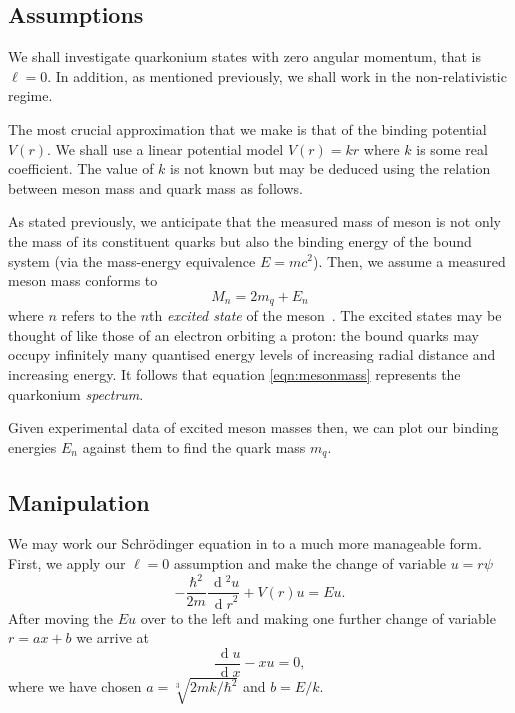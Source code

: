 \documentclass[]{article}
\renewcommand{\d}[1]{\ensuremath{\,\operatorname{d}\!{#1}}}
\begin{document}
\subsection{Assumptions}\label{ssec:assumptions}

We shall investigate quarkonium states with zero angular momentum, that is $\ell = 0$. In addition, as mentioned previously, we shall work in the non-relativistic regime.

The most crucial approximation that we make is that of the binding potential $V(r)$. We shall use a linear potential model $V(r) = kr$ where $k$ is some real coefficient. The value of $k$ is not known but may be deduced using the relation between meson mass and quark mass as follows.

As stated previously, we anticipate that the measured mass of meson is not only the mass of its constituent quarks but also the binding energy of the bound system (via the mass-energy equivalence $E=mc^{2}$). Then, we assume a measured meson mass conforms to
\begin{equation}\label{eqn:mesonmass}
M_{n} = 2m_{q} + E_{n}
\end{equation}
where $n$ refers to the $n$th \emph{excited state} of the meson~\cite{ref:buchmuller}. The excited states may be thought of like those of an electron orbiting a proton: the bound quarks may occupy infinitely many quantised energy levels of increasing radial distance and increasing energy. It follows that equation \ref{eqn:mesonmass} represents the quarkonium \emph{spectrum}.

Given experimental data of excited meson masses then, we can plot our binding energies $E_{n}$ against them to find the quark mass $m_{q}$.

\subsection{Manipulation}

We may work our Schr\"{o}dinger equation in to a much more manageable form. First, we apply our $\ell = 0$ assumption and make the change of variable $u = r\psi$
\[
-\frac{\hbar^{2}}{2m}
 \frac{\d{^{2}u}}{\d{r}^{2}}
+ V(r)u = Eu.
\]
After moving the $Eu$ over to the left and making one further change of variable $r = ax + b$ we  arrive at
\begin{equation}\label{eqn:airys}
\frac{\d{u}}{\d{x}} - xu = 0,
\end{equation}
where we have chosen $a = \sqrt[3]{2mk/\hbar^{2}}$ and $b = E/k$.
\end{document}
